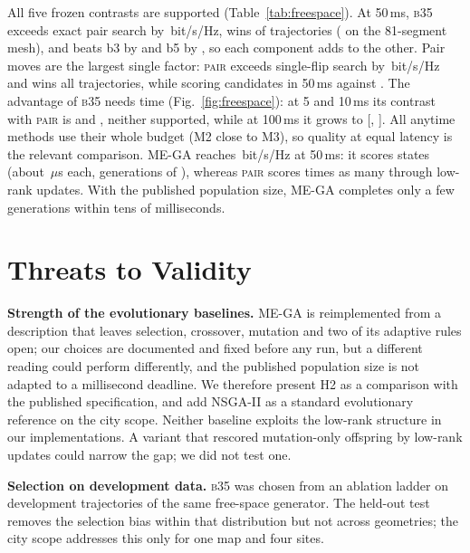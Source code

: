 \documentclass[runningheads]{llncs}
\newcommand{\bts}{\textsc{b35}}
\begin{document}
All five frozen contrasts are supported (Table~\ref{tab:freespace}). At 50\,ms, \bts{} exceeds exact pair search by \,bit/s/Hz, wins  of  trajectories ( on the 81-segment mesh), and beats b3 by  and b5 by , so each component adds to the other. Pair moves are the largest single factor: \textsc{pair} exceeds single-flip search by \,bit/s/Hz and wins all  trajectories, while scoring  candidates in 50\,ms against . The advantage of \bts{} needs time (Fig.~\ref{fig:freespace}): at 5 and 10\,ms its contrast with \textsc{pair} is  and , neither supported, while at 100\,ms it grows to  [, ]. All anytime methods use their whole budget (M2 close to M3), so quality at equal latency is the relevant comparison. ME-GA reaches \,bit/s/Hz at 50\,ms: it scores  states (about \,$\mu$s each,  generations of ), whereas \textsc{pair} scores  times as many through low-rank updates. With the published population size, ME-GA completes only a few generations within tens of milliseconds.

\section{Threats to Validity}\label{sec:threats}
\textbf{Strength of the evolutionary baselines.} ME-GA is reimplemented from a description that leaves selection, crossover, mutation and two of its adaptive rules open; our choices are documented and fixed before any run, but a different reading could perform differently, and the published population size is not adapted to a millisecond deadline. We therefore present H2 as a comparison with the published specification, and add NSGA-II as a standard evolutionary reference on the city scope. Neither baseline exploits the low-rank structure in our implementations. A variant that rescored mutation-only offspring by low-rank updates could narrow the gap; we did not test one.

\textbf{Selection on development data.} \bts{} was chosen from an ablation ladder on development trajectories of the same free-space generator. The held-out test removes the selection bias within that distribution but not across geometries; the city scope addresses this only for one map and four sites.
\end{document}
